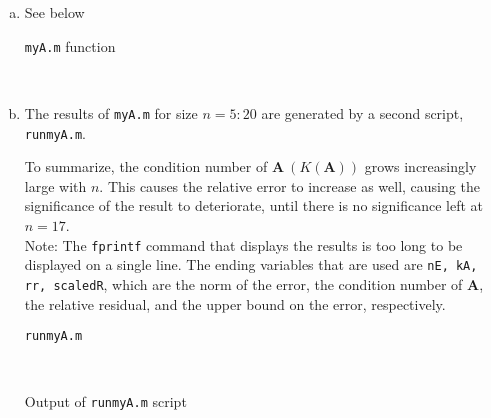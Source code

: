 \documentclass[11pt]{article}
\begin{document}
\begin{enumerate}
\begin{enumerate}[(a)]
		\item See below

			\begin{center}
				\texttt{myA.m} function
			\end{center}
			 \

		\item The results of \texttt{myA.m} for size $n =5:20$ are generated by a second script, \texttt{runmyA.m}.

			To summarize,
			the condition number of $\mathbf{A}\ (K(\mathbf{A}))$ grows increasingly large with $n$. This causes the relative
			error to increase as well, causing the significance of the result to deteriorate, until there is no significance left
			at $n=17$. \\

			Note: The \texttt{fprintf} command that displays the results is too long to be displayed on a single line. The ending
			variables that are used are \texttt{nE, kA, rr, scaledR}, which are the norm of the error, the condition number of
			$\mathbf{A}$, the relative residual, and the upper bound on the error, respectively.

			\begin{center}
				\texttt{runmyA.m}
			\end{center}
			 \

			\begin{center}
				Output of \texttt{runmyA.m} script
			\end{center}
			 \

	\end{enumerate}

\end{enumerate}
\end{document}
